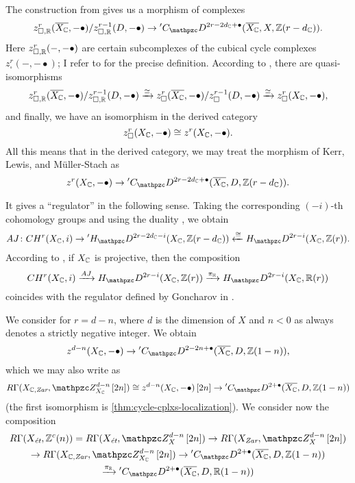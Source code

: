 The construction from \cite[\S 5.9]{Kerr-Lewis-Muller-Stach-2006} gives us a
morphism of complexes
\[ z^r_{\square,\RR} (\overline{X_\CC}, -\bullet)/z_{\square,\RR}^{r-1} (D, -\bullet) \to
  {}' C_\mathcal{D}^{2r - 2d_\CC + \bullet} (\overline{X_\CC}, X, \ZZ (r-d_\CC)). \]
Here $z^r_{\square,\mathbb{R}} (-, -\bullet)$ are certain subcomplexes of the cubical
cycle complexes $z^r_\square (-, -\bullet)$; I refer to
\cite[\S 5.4]{Kerr-Lewis-Muller-Stach-2006} for the precise
definition. According to \cite[\S 5.9]{Kerr-Lewis-Muller-Stach-2006}, there are
quasi-isomorphisms
\[ z^r_{\square,\mathbb{R}} (\overline{X_{\mathbb{C}}}, -\bullet)/z_{\square,\mathbb{R}}^{r-1} (D, -\bullet)
  \xrightarrow{\simeq}
  z^r_\square (\overline{X_{\mathbb{C}}}, -\bullet)/z_\square^{r-1} (D, -\bullet)
  \xrightarrow{\simeq} z^r_\square (X_{\mathbb{C}}, -\bullet), \]
and finally, we have an isomorphism in the derived category
$$z^r_\square (X_{\mathbb{C}}, -\bullet) \cong z^r (X_{\mathbb{C}}, -\bullet).$$
All this means that in the derived category, we may treat the morphism of Kerr,
Lewis, and Müller-Stach as
\begin{equation}
  \label{eqn:KLMS-map}
  z^r (X_\CC, -\bullet) \to
  {}' C_\mathcal{D}^{2r - 2d_\CC + \bullet} (\overline{X_\CC}, D, \ZZ (r-d_\CC)).
\end{equation}

It gives a ``regulator'' in the following sense. Taking the corresponding
$(-i)$-th cohomology groups and using the duality
, we obtain
\[ AJ\colon CH^r (X_\CC, i) \to
  {}' H_\mathcal{D}^{2r - 2d_\CC - i} (X_\CC, \ZZ (r-d_\CC))
  \xleftarrow{\isom}
  H_\mathcal{D}^{2r-i} (X_\CC, \ZZ (r)). \]
According to \cite[\S 5.5]{Kerr-Lewis-Muller-Stach-2006}, if $X_{\mathbb{C}}$ is
projective, then the composition
\[ CH^r (X_\CC, i) \xrightarrow{AJ}
  H_\mathcal{D}^{2r-i} (X_\CC, \ZZ (r)) \xrightarrow{\pi_\RR}
  H_\mathcal{D}^{2r-i} (X_\CC, \RR (r)) \]
coincides with the regulator defined by Goncharov in \cite{Goncharov-1995}.

\vspace{1em}

We consider  for $r = d-n$, where $d$ is the dimension of
$X$ and $n < 0$ as always denotes a strictly negative integer. We obtain
\[ z^{d-n} (X_\CC, -\bullet) \to
  {}' C_\mathcal{D}^{2-2n + \bullet} (\overline{X_\CC}, D, \ZZ (1-n)), \]
which we may also write as
\[ R\Gamma (X_{\CC,\text{\it Zar}}, \mathcal{Z}^{d-n}_{X_\CC}\,[2n]) \isom
  z^{d-n} (X_\CC, -\bullet)\,[2n] \to
  {}' C_\mathcal{D}^{2+\bullet} (\overline{X_\CC}, D, \ZZ (1-n)) \]
(the first isomorphism is \ref{thm:cycle-cplxs-localization}). We consider now
the composition
\begin{multline*}
  R\Gamma (X_\text{\it ét}, \ZZ^c (n)) =
  R\Gamma (X_\text{\it ét}, \mathcal{Z}^{d-n}_X\,[2n]) \to
  R\Gamma (X_\text{\it Zar}, \mathcal{Z}^{d-n}_X\,[2n]) \\
  \to R\Gamma (X_{\CC,\text{\it Zar}}, \mathcal{Z}^{d-n}_{X_\CC}\,[2n])
  \to {}' C_\mathcal{D}^{2+\bullet} (\overline{X_\CC}, D, \ZZ (1-n)) \\
  \xrightarrow{\pi_\RR} {}' C_\mathcal{D}^{2+\bullet} (\overline{X_\CC}, D, \RR (1-n))
\end{multline*}

